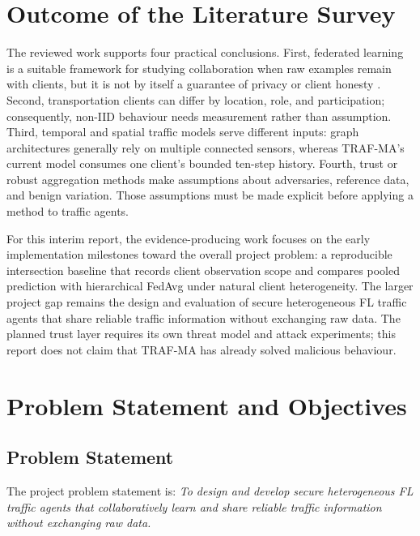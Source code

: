 \section{Outcome of the Literature Survey}
The reviewed work supports four practical conclusions. First, federated learning is a suitable framework for studying collaboration when raw examples remain with clients, but it is not by itself a guarantee of privacy or client honesty \cite{mcmahan2017,chellapandi2023}. Second, transportation clients can differ by location, role, and participation; consequently, non-IID behaviour needs measurement rather than assumption. Third, temporal and spatial traffic models serve different inputs: graph architectures generally rely on multiple connected sensors, whereas TRAF-MA's current model consumes one client's bounded ten-step history. Fourth, trust or robust aggregation methods make assumptions about adversaries, reference data, and benign variation. Those assumptions must be made explicit before applying a method to traffic agents.

For this interim report, the evidence-producing work focuses on the early implementation milestones toward the overall project problem: a reproducible intersection baseline that records client observation scope and compares pooled prediction with hierarchical FedAvg under natural client heterogeneity. The larger project gap remains the design and evaluation of secure heterogeneous FL traffic agents that share reliable traffic information without exchanging raw data. The planned trust layer requires its own threat model and attack experiments; this report does not claim that TRAF-MA has already solved malicious behaviour.

\section{Problem Statement and Objectives}\label{sec:problem}
\subsection{Problem Statement}
The project problem statement is: \emph{To design and develop secure heterogeneous FL traffic agents that collaboratively learn and share reliable traffic information without exchanging raw data.}


